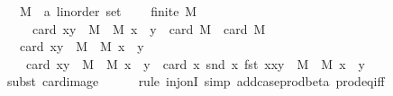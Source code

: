 \begin{isabellebody}
\ \ \ M\ {\isacharcolon}{\kern0pt}{\isacharcolon}{\kern0pt}\ {\isachardoublequoteopen}{\isacharparenleft}{\kern0pt}{\isacharprime}{\kern0pt}a\ {\isacharcolon}{\kern0pt}{\isacharcolon}{\kern0pt}linorder{\isacharparenright}{\kern0pt}\ set{\isachardoublequoteclose}\ \isanewline
\ \ \ {\isachardoublequoteopen}finite\ M{\isachardoublequoteclose}\isanewline
\ \ \ {\isachardoublequoteopen}{}\ {\isacharasterisk}{\kern0pt}\ card\ {\isacharbraceleft}{\kern0pt}{\isacharparenleft}{\kern0pt}x{\isacharcomma}{\kern0pt}y{\isacharparenright}{\kern0pt}\ {\isasymin}\ M\ {\isasymtimes}\ M{\isachardot}{\kern0pt}\ x\ {\isacharless}{\kern0pt}\ y{\isacharbraceright}{\kern0pt}\ {\isacharequal}{\kern0pt}\ card\ M\ {\isacharasterisk}{\kern0pt}\ {\isacharparenleft}{\kern0pt}card\ M\ {\isacharminus}{\kern0pt}\ {}{\isacharparenright}{\kern0pt}{\isachardoublequoteclose}\isanewline
%
\isadelimproof
%
\endisadelimproof
%
\isatagproof
{}\isamarkupfalse%
\ {\isacharminus}{\kern0pt}\isanewline
\ \ \isamarkupfalse%
\ {\isachardoublequoteopen}{}\ {\isacharasterisk}{\kern0pt}\ card\ {\isacharbraceleft}{\kern0pt}{\isacharparenleft}{\kern0pt}x{\isacharcomma}{\kern0pt}y{\isacharparenright}{\kern0pt}\ {\isasymin}\ M\ {\isasymtimes}\ M{\isachardot}{\kern0pt}\ x\ {\isacharless}{\kern0pt}\ y{\isacharbraceright}{\kern0pt}\ {\isacharequal}{\kern0pt}\isanewline
\ \ \ \ card\ {\isacharbraceleft}{\kern0pt}{\isacharparenleft}{\kern0pt}x{\isacharcomma}{\kern0pt}y{\isacharparenright}{\kern0pt}\ {\isasymin}\ M\ {\isasymtimes}\ M{\isachardot}{\kern0pt}\ x\ {\isacharless}{\kern0pt}\ y{\isacharbraceright}{\kern0pt}\ {\isacharplus}{\kern0pt}\ card\ {\isacharparenleft}{\kern0pt}{\isacharparenleft}{\kern0pt}{\isasymlambda}x{\isachardot}{\kern0pt}\ {\isacharparenleft}{\kern0pt}snd\ x{\isacharcomma}{\kern0pt}\ fst\ x{\isacharparenright}{\kern0pt}{\isacharparenright}{\kern0pt}{\isacharbackquote}{\kern0pt}{\isacharbraceleft}{\kern0pt}{\isacharparenleft}{\kern0pt}x{\isacharcomma}{\kern0pt}y{\isacharparenright}{\kern0pt}\ {\isasymin}\ M\ {\isasymtimes}\ M{\isachardot}{\kern0pt}\ x\ {\isacharless}{\kern0pt}\ y{\isacharbraceright}{\kern0pt}{\isacharparenright}{\kern0pt}{\isachardoublequoteclose}\isanewline
\ \ \ \ \isamarkupfalse%
\ {\isacharparenleft}{\kern0pt}subst\ card{\isacharunderscore}{\kern0pt}image{\isacharparenright}{\kern0pt}\isanewline
\ \ \ \ \isamarkupfalse%
\ {\isacharparenleft}{\kern0pt}rule\ inj{\isacharunderscore}{\kern0pt}onI{\isacharcomma}{\kern0pt}\ simp\ add{\isacharcolon}{\kern0pt}case{\isacharunderscore}{\kern0pt}prod{\isacharunderscore}{\kern0pt}beta\ prod{\isacharunderscore}{\kern0pt}eq{\isacharunderscore}{\kern0pt}iff{\isacharparenright}{\kern0pt}\isanewline

\end{isabellebody}
